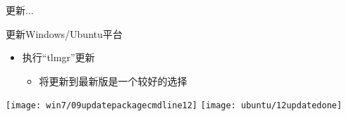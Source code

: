\documentclass[fontset = none, t]{ctexbeamer}
\begin{document}
\begin{frame}
  更新...
\end{frame}

\begin{frame}{更新\tl}{Windows/Ubuntu平台}
  \begin{spacing}{1.5}
    \begin{itemize}
    \item 执行\enquote{tlmgr}更新\tl %
      \begin{itemize}
      \item 将\tl 更新到最新版是一个较好的选择
      \end{itemize}
    \end{itemize}
    \begin{center}
      \texttt{[image: win7/09updatepackagecmdline12]}
      \texttt{[image: ubuntu/12updatedone]}
    \end{center}
  \end{spacing}
\end{frame}
\end{document}
